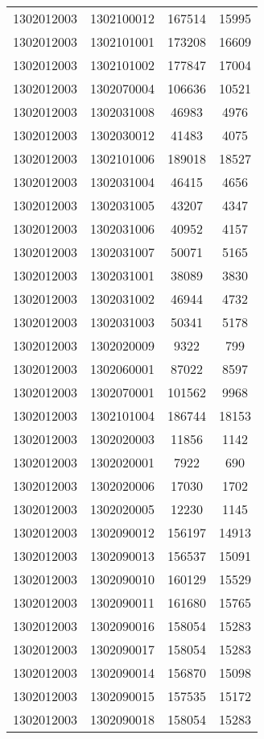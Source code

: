 \begin{longtable}[h]{llcc}
		1302012003 & 1302100012 & 167514 & 15995\\
		1302012003 & 1302101001 & 173208 & 16609\\
		1302012003 & 1302101002 & 177847 & 17004\\
		1302012003 & 1302070004 & 106636 & 10521\\
		1302012003 & 1302031008 & 46983 & 4976\\
		1302012003 & 1302030012 & 41483 & 4075\\
		1302012003 & 1302101006 & 189018 & 18527\\
		1302012003 & 1302031004 & 46415 & 4656\\
		1302012003 & 1302031005 & 43207 & 4347\\
		1302012003 & 1302031006 & 40952 & 4157\\
		1302012003 & 1302031007 & 50071 & 5165\\
		1302012003 & 1302031001 & 38089 & 3830\\
		1302012003 & 1302031002 & 46944 & 4732\\
		1302012003 & 1302031003 & 50341 & 5178\\
		1302012003 & 1302020009 & 9322 & 799\\
		1302012003 & 1302060001 & 87022 & 8597\\
		1302012003 & 1302070001 & 101562 & 9968\\
		1302012003 & 1302101004 & 186744 & 18153\\
		1302012003 & 1302020003 & 11856 & 1142\\
		1302012003 & 1302020001 & 7922 & 690\\
		1302012003 & 1302020006 & 17030 & 1702\\
		1302012003 & 1302020005 & 12230 & 1145\\
		1302012003 & 1302090012 & 156197 & 14913\\
		1302012003 & 1302090013 & 156537 & 15091\\
		1302012003 & 1302090010 & 160129 & 15529\\
		1302012003 & 1302090011 & 161680 & 15765\\
		1302012003 & 1302090016 & 158054 & 15283\\
		1302012003 & 1302090017 & 158054 & 15283\\
		1302012003 & 1302090014 & 156870 & 15098\\
		1302012003 & 1302090015 & 157535 & 15172\\
		1302012003 & 1302090018 & 158054 & 15283\\

\end{longtable}
